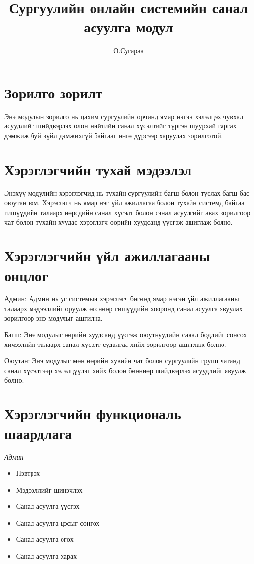 \documentclass[12pt]{article}
\begin{document}
	
	
	\section     {Зорилго зорилт}
	
	Энэ модулын зорилго нь цахим сургуулийн орчинд ямар нэгэн хэлэлцэх чувхал асуудлийг шийдвэрлэх олон нийтийн санал хүсэлтийг түргэн шуурхай гаргах дэмжиж буй зүйл дэмжихгүй байгааг өнгө дүрсээр харуулах 
	зорилготой.
	
	
	
	
	\section  {Хэрэглэгчийн тухай мэдээлэл}
	
	Энэхүү модулийн хэрэглэгчид нь тухайн сургуулийн багш болон туслах багш бас оюутан юм. Хэрэглэгч нь ямар нэг үйл ажиллагаа болон тухайн системд байгаа гишүүдийн талаарх өөрсдийн санал хүсэлт болон санал асуулгийг авах зорилгоор чат болон тухайн хуудас хэрэглэгч өөрийн хуудсанд үүсгэж ашиглаж болно.
	
	\section  {Хэрэглэгчийн үйл ажиллагааны онцлог}
	
	{Админ:} Админ нь уг системын хэрэглэгч бөгөөд ямар нэгэн үйл ажиллагааны талаарх мэдээллийг оруулж өгснөөр гишүүдийн хооронд санал асуулга явуулах зорилгоор энэ модулыг ашгилна.
	
	
	{Багш:} Энэ модулыг  өөрийн хуудсанд үүсгэж оюутнуудийн санал бодлийг сонсох хичээлийн талаарх санал хүсэлт судалгаа хийх зорилгоор ашиглаж болно. 
	
	{Оюутан:} Энэ модулыг мөн өөрийн хувийн чат болон сургуулийн групп чатанд санал хүсэлтээр хэлэлцүүлэг хийх болон бөөнөөр шийдвэрлэх асуудлийг  явуулж болно.
	
	\title{Сургуулийн онлайн системийн санал асуулга модул}
	
	\author{О.Сугараа}
	
	\section{Хэрэглэгчийн функциональ шаардлага}
	\textit {Админ}
	\begin{itemize}
		[label=*, nosep]
        \item Нэвтрэх
		\item Мэдээллийг шинэчлэх 
		\item Санал асуулга үүсгэх
		\item Санал асуулга цэсыг сонгох
		\item Санал асуулга өгөх
		\item Санал асуулга харах
	\end{itemize}
\end{document}
